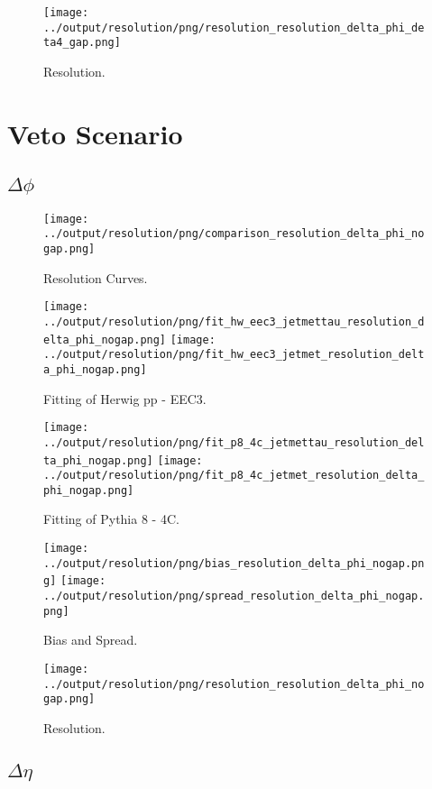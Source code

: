 \documentclass[11pt]{book}
\begin{document}
\begin{figure}[ht]
\centering
\texttt{[image: ../output/resolution/png/resolution\_resolution\_delta\_phi\_deta4\_gap.png]}
\caption{Resolution.}
\end{figure}
\clearpage


\chapter{Veto Scenario}
\section{$\Delta\phi$}

\begin{figure}[ht]
\centering
\texttt{[image: ../output/resolution/png/comparison\_resolution\_delta\_phi\_nogap.png]}
\caption{Resolution Curves.}
\end{figure}


\begin{figure}[ht]
\centering
\texttt{[image: ../output/resolution/png/fit\_hw\_eec3\_jetmettau\_resolution\_delta\_phi\_nogap.png]}
\texttt{[image: ../output/resolution/png/fit\_hw\_eec3\_jetmet\_resolution\_delta\_phi\_nogap.png]}
\caption{Fitting of Herwig pp - EEC3.}
\end{figure}

\begin{figure}[ht]
\centering
\texttt{[image: ../output/resolution/png/fit\_p8\_4c\_jetmettau\_resolution\_delta\_phi\_nogap.png]}
\texttt{[image: ../output/resolution/png/fit\_p8\_4c\_jetmet\_resolution\_delta\_phi\_nogap.png]}
\caption{Fitting of Pythia 8 - 4C.}
\end{figure}

\begin{figure}[ht]
\centering
\texttt{[image: ../output/resolution/png/bias\_resolution\_delta\_phi\_nogap.png]}
\texttt{[image: ../output/resolution/png/spread\_resolution\_delta\_phi\_nogap.png]}
\caption{Bias and Spread.}
\end{figure}


\begin{figure}[ht]
\centering
\texttt{[image: ../output/resolution/png/resolution\_resolution\_delta\_phi\_nogap.png]}
\caption{Resolution.}
\end{figure}
\clearpage

\section{$\Delta\eta$}
\end{document}
